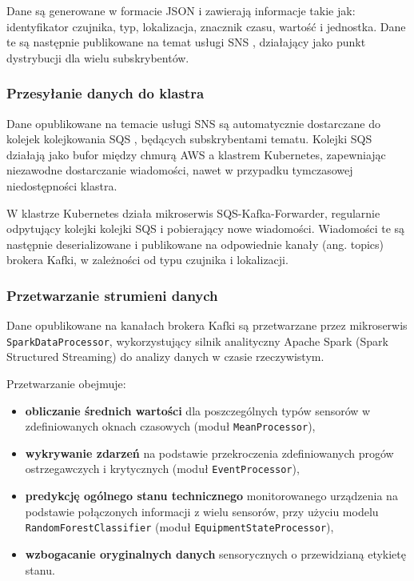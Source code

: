 Dane są generowane w formacie JSON i zawierają informacje takie jak: identyfikator czujnika, typ, lokalizacja, znacznik czasu, wartość i
jednostka. Dane te są następnie publikowane na temat usługi SNS \cite{sns_docs}, działający jako punkt dystrybucji dla wielu subskrybentów.

\subsubsection{Przesyłanie danych do klastra}
\label{subsubsec:przesylanie_danych}

Dane opublikowane na temacie usługi SNS są automatycznie dostarczane do kolejek kolejkowania SQS \cite{sqs_docs}, będących subskrybentami tematu. Kolejki SQS działają jako bufor między chmurą AWS a klastrem Kubernetes, zapewniając niezawodne dostarczanie wiadomości, nawet w przypadku tymczasowej niedostępności klastra.

W klastrze Kubernetes działa mikroserwis SQS-Kafka-Forwarder, regularnie odpytujący kolejki kolejki SQS i pobierający nowe wiadomości. Wiadomości te są następnie deserializowane i publikowane na odpowiednie kanały (ang. topics) brokera Kafki, w zależności od typu czujnika i lokalizacji.

\subsubsection{Przetwarzanie strumieni danych}
\label{subsubsec:przetwarzanie_strumieni}

Dane opublikowane na kanałach brokera Kafki są przetwarzane przez mikroserwis \texttt{SparkDataProcessor}, wykorzystujący silnik analityczny Apache Spark (Spark Structured Streaming) \cite{spark_streaming} do analizy danych w czasie rzeczywistym. 

\vspace{0.3em}

Przetwarzanie obejmuje:

\begin{itemize}
    \item \textbf{obliczanie średnich wartości} dla poszczególnych typów sensorów w zdefiniowanych oknach czasowych (moduł \texttt{MeanProcessor}),
    \item \textbf{wykrywanie zdarzeń} na podstawie przekroczenia zdefiniowanych progów ostrzegawczych i krytycznych (moduł \texttt{EventProcessor}),
    \item \textbf{predykcję ogólnego stanu technicznego} monitorowanego urządzenia na podstawie połączonych informacji z wielu sensorów, przy użyciu modelu \texttt{RandomForestClassifier} (moduł \texttt{EquipmentStateProcessor}),
    \item \textbf{wzbogacanie oryginalnych danych} sensorycznych o przewidzianą etykietę stanu.
\end{itemize}

